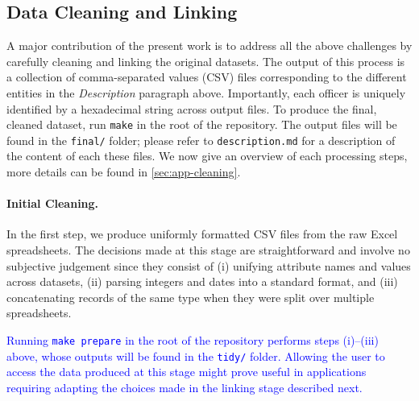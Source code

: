 \subsection{Data Cleaning and Linking}\label{sec:cleaning}

A major contribution of the present work is to address all the above challenges
by carefully cleaning and linking the original datasets. The output of this
process is a collection of comma-separated values (CSV) files corresponding to
the different entities in the \emph{Description} paragraph above.  Importantly,
each officer is uniquely identified by a hexadecimal string across output
files. To produce the final, cleaned dataset, run \texttt{make} in the root of
the repository. The output files will be found in the \texttt{final/} folder;
please refer to \texttt{description.md} for a description of the content of
each these files. We now give an overview of each processing steps, more
details can be found in \cref{sec:app-cleaning}.

\paragraph{Initial Cleaning.} In the first step, we produce uniformly formatted
CSV files from the raw Excel spreadsheets. The decisions made at this stage are
straightforward and involve no subjective judgement since they consist of (i)
unifying attribute names and values across datasets, (ii) parsing integers and
dates into a standard format, and (iii) concatenating records of the same type
when they were split over multiple spreadsheets.


\textcolor{blue}{Running \texttt{make prepare} in the root of the repository
performs steps (i)--(iii) above, whose outputs will be found in the
\texttt{tidy/} folder. Allowing the user to access the data produced at this
stage might prove useful in applications requiring adapting the choices made in
the linking stage described next.}

